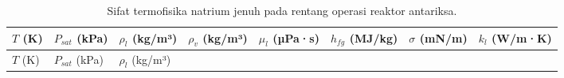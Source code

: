 \documentclass[
  indonesian,
  12pt,
  a4paper,
]{report}
\begin{document}
\begin{longtable}[]{@{}
  >{\centering\arraybackslash}p{}
  >{\centering\arraybackslash}p{}
  >{\centering\arraybackslash}p{}
  >{\centering\arraybackslash}p{}
  >{\centering\arraybackslash}p{}
  >{\centering\arraybackslash}p{}
  >{\centering\arraybackslash}p{}
  >{\centering\arraybackslash}p{}@{}}
\caption{Sifat termofisika natrium jenuh pada rentang operasi reaktor
antariksa.}\label{tbl-sifat}\tabularnewline
\toprule\noalign{}
\begin{minipage}[b]{\linewidth}\centering
\(T\) (K)
\end{minipage} & \begin{minipage}[b]{\linewidth}\centering
\(P_{sat}\) (kPa)
\end{minipage} & \begin{minipage}[b]{\linewidth}\centering
\(\rho_l\) (kg/m³)
\end{minipage} & \begin{minipage}[b]{\linewidth}\centering
\(\rho_v\) (kg/m³)
\end{minipage} & \begin{minipage}[b]{\linewidth}\centering
\(\mu_l\) (µPa·s)
\end{minipage} & \begin{minipage}[b]{\linewidth}\centering
\(h_{fg}\) (MJ/kg)
\end{minipage} & \begin{minipage}[b]{\linewidth}\centering
\(\sigma\) (mN/m)
\end{minipage} & \begin{minipage}[b]{\linewidth}\centering
\(k_l\) (W/m·K)
\end{minipage} \\
\midrule\noalign{}
\endfirsthead
\toprule\noalign{}
\begin{minipage}[b]{\linewidth}\centering
\(T\) (K)
\end{minipage} & \begin{minipage}[b]{\linewidth}\centering
\(P_{sat}\) (kPa)
\end{minipage} & \begin{minipage}[b]{\linewidth}\centering
\(\rho_l\) (kg/m³)
\end{minipage} & \begin{minipage}[b]{\linewidth}\centering

\end{minipage}
\end{longtable}
\end{document}

